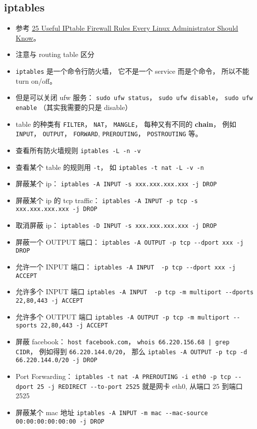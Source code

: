 \subsection{iptables}
\begin{itemize}
\item 参考 \href{https://www.tecmint.com/linux-iptables-firewall-rules-examples-commands/}{25 Useful IPtable Firewall Rules Every Linux Administrator Should Know}。
\item 注意与 routing table 区分
\item \verb|iptables| 是一个命令行防火墙， 它不是一个 service 而是个命令， 所以不能 turn on/off。
\item 但是可以关闭 ufw 服务： \verb|sudo ufw status|， \verb|sudo ufw disable|， \verb|sudo ufw enable| （其实我需要的只是 disable）
\item table 的种类有 \verb|FILTER|， \verb|NAT|， \verb|MANGLE|， 每种又有不同的 \textbf{chain}， 例如 \verb|INPUT|， \verb|OUTPUT|， \verb|FORWARD|,  \verb|PREROUTING|， \verb|POSTROUTING| 等。
\item 查看所有防火墙规则 \verb|iptables -L -n -v|
\item 查看某个 table 的规则用 \verb|-t|， 如 \verb|iptables -t nat -L -v -n|
\item 屏蔽某个 ip： \verb|iptables -A INPUT -s xxx.xxx.xxx.xxx -j DROP|
\item 屏蔽某个 ip 的 tcp traffic： \verb|iptables -A INPUT -p tcp -s xxx.xxx.xxx.xxx -j DROP|
\item 取消屏蔽 ip： \verb|iptables -D INPUT -s xxx.xxx.xxx.xxx -j DROP|
\item 屏蔽一个 OUTPUT 端口： \verb|iptables -A OUTPUT -p tcp --dport xxx -j DROP|
\item 允许一个 INPUT 端口：  \verb|iptables -A INPUT  -p tcp --dport xxx -j ACCEPT|
\item 允许多个 INPUT 端口 \verb|iptables -A INPUT  -p tcp -m multiport --dports 22,80,443 -j ACCEPT|
\item 允许多个 OUTPUT 端口 \verb|iptables -A OUTPUT -p tcp -m multiport --sports 22,80,443 -j ACCEPT|
\item 屏蔽 facebook： \verb|host facebook.com|， \verb`whois 66.220.156.68 | grep CIDR`， 例如得到 \verb|66.220.144.0/20|， 那么 \verb|iptables -A OUTPUT -p tcp -d 66.220.144.0/20 -j DROP|
\item Port Forwarding： \verb|iptables -t nat -A PREROUTING -i eth0 -p tcp --dport 25 -j REDIRECT --to-port 2525| 就是网卡 eth0, 从端口 25 到端口 2525
\item 屏蔽某个 mac 地址 \verb|iptables -A INPUT -m mac --mac-source 00:00:00:00:00:00 -j DROP|
\end{itemize}

